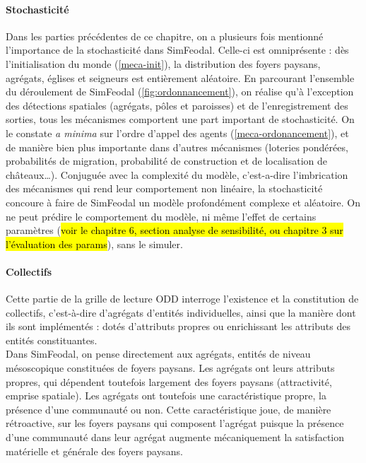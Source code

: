 \paragraph{Stochasticité} Dans les parties précédentes de ce chapitre, on a plusieurs fois mentionné l'importance de la stochasticité dans SimFeodal.
Celle-ci est omniprésente : dès l'initialisation du monde (\cref{meca-init}), la distribution des foyers paysans, agrégats, églises et seigneurs est entièrement aléatoire.
En parcourant l'ensemble du déroulement de SimFeodal (\cref{fig:ordonnancement}), on réalise qu'à l'exception des détections spatiales (agrégats, pôles et paroisses) et de l'enregistrement des sorties, tous les mécanismes comportent une part important de stochasticité.
On le constate \textit{a minima} sur l'ordre d'appel des agents (\cref{meca-ordonancement}), et de manière bien plus importante dans d'autres mécanismes (loteries pondérées, probabilités de migration, probabilité de construction et de localisation de châteaux\ldots).
Conjuguée avec la complexité du modèle, c'est-a-dire l'imbrication des mécanismes qui rend leur comportement non linéaire, la stochasticité concoure à faire de SimFeodal un modèle profondément complexe et aléatoire.
On ne peut prédire le comportement du modèle, ni même l'effet de certains paramètres (\hl{voir le chapitre 6, section analyse de sensibilité, ou chapitre 3 sur l'évaluation des params}), sans le simuler.


\paragraph{Collectifs} Cette partie de la grille de lecture ODD interroge l'existence et la constitution de \og collectifs\fg{}, c'est-à-dire d'agrégats d'entités individuelles, ainsi que la manière dont ils sont implémentés : dotés
d'attributs propres ou enrichissant les attributs des entités constituantes.
\\
Dans SimFeodal, on pense directement aux agrégats, entités de niveau mésoscopique constituées de foyers paysans.
Les agrégats ont leurs attributs propres, qui dépendent toutefois largement des foyers paysans (attractivité, emprise spatiale).
Les agrégats ont toutefois une caractéristique propre, la présence d'une communauté ou non.
Cette caractéristique joue, de manière rétroactive, sur les foyers paysans qui composent l'agrégat puisque la présence d'une communauté dans leur agrégat augmente mécaniquement la satisfaction matérielle et générale des foyers paysans.

